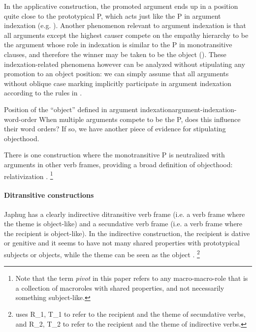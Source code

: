 \documentclass[a4paper, oneside, 12pt]{report}
\newcommand*{\citesec}[1]{\S~{#1}}
\newcommand*{\citepage}[1]{p.~{#1}}
\newcommand*{\term}[1]{\emph{#1}}
\begin{document}
In the applicative construction,
the promoted argument ends up in a position quite close to the prototypical P,
which acts just like the P in argument indexation
(e.g. \citealt[\citepage{863}, (102)]{jacques2021grammar}).
Another phenomenon relevant to argument indexation is that
all arguments except the highest causer compete on the empathy hierarchy
to be the argument whose role in indexation is similar to the P in monotransitive clauses,
and therefore the winner may be taken to be the object
().
These indexation-related phenomena however can be analyzed without stipulating 
any promotion to an object position:
we can simply assume that all arguments without oblique case marking
implicitly participate in argument indexation 
according to the rules in .

\begin{todobox}{Position of the ``object'' defined in argument indexation}{argument-indexation-word-order}
    When multiple arguments compete to be the P,
    does this influence their word orders?
    If so, we have another piece of evidence for stipulating objecthood.
\end{todobox}

There is one construction where the monotransitive P is neutralized with
arguments in other verb frames, providing a broad definition of objecthood:
relativization \citep{jacques2016subjects}.%
\footnote{
    Note that the term \term{pivot} in this paper refers to 
    any macro-macro-role that is a collection of macroroles with shared properties,
    and not necessarily something subject-like.
}

\paragraph*{Ditransitive constructions}
Japhug has a clearly indirective ditransitive verb frame
(i.e. a verb frame where the theme is object-like)
and a secundative verb frame  
(i.e. a verb frame where the recipient is object-like).
In the indirective construction,
the recipient is dative or genitive \citep[\citesec{14.4.1}]{jacques2021grammar}
and it seems to have not many shared properties with prototypical subjects or objects,
while the theme can be seen as the object \citep{jacques2016subjects}.%
\footnote{
    \citet{jacques2016subjects} 
    uses R_1, T_1 to refer to the recipient and the theme of secundative verbs,
    and R_2, T_2 to refer to the recipient and the theme of indirective verbs. 
}
\end{document}
